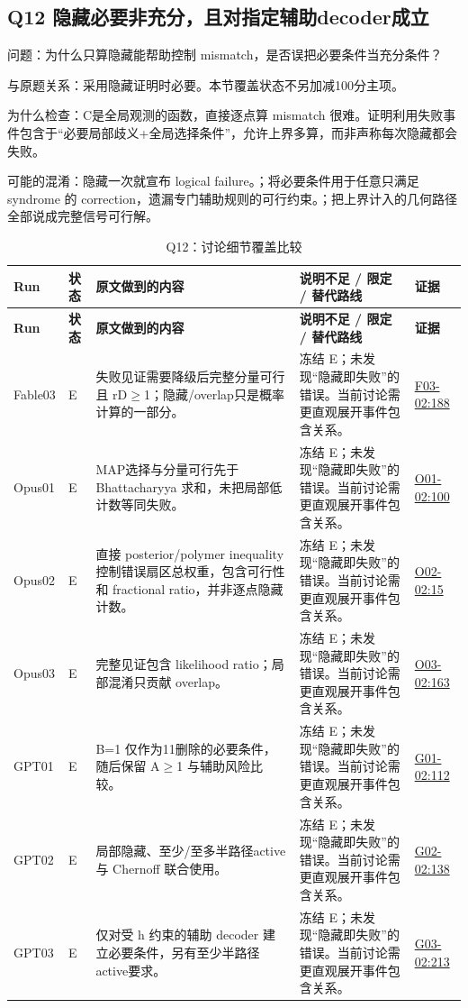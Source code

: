 \documentclass[11pt,a4paper]{article}
\begin{document}
\clearpage
\subsection{Q12 隐藏必要非充分，且对指定辅助decoder成立}
\label{aspect:Q12}
问题：为什么只算隐藏能帮助控制 mismatch，是否误把必要条件当充分条件？

与原题关系：采用隐藏证明时必要。本节覆盖状态不另加减100分主项。

为什么检查：C是全局观测的函数，直接逐点算 mismatch 很难。证明利用失败事件包含于“必要局部歧义+全局选择条件”，允许上界多算，而非声称每次隐藏都会失败。

可能的混淆：隐藏一次就宣布 logical failure。；将必要条件用于任意只满足 syndrome 的 correction，遗漏专门辅助规则的可行约束。；把上界计入的几何路径全部说成完整信号可行解。

{\fontsize{9.0}{12.6}\selectfont
\setlength{\tabcolsep}{2.5pt}
\begin{longtable}{>{\raggedright\arraybackslash}p{}>{\raggedright\arraybackslash}p{}>{\raggedright\arraybackslash}p{}>{\raggedright\arraybackslash}p{}>{\raggedright\arraybackslash}p{}}
\caption{Q12：讨论细节覆盖比较}\\
\toprule
\textbf{Run} & \textbf{状态} & \textbf{原文做到的内容} & \textbf{说明不足 / 限定 / 替代路线} & \textbf{证据}\tabularnewline
\midrule
\endfirsthead
\toprule
\textbf{Run} & \textbf{状态} & \textbf{原文做到的内容} & \textbf{说明不足 / 限定 / 替代路线} & \textbf{证据}\tabularnewline
\midrule
\endhead
{}Fable03 & E & 失败见证需要降级后完整分量可行且 rD\ensuremath{\geq}1；隐藏/overlap只是概率计算的一部分。 & 冻结 E；未发现“隐藏即失败”的错误。当前讨论需更直观展开事件包含关系。 & \hyperref[src:F03-02]{F03-02:188}\tabularnewline
{}Opus01 & E & MAP选择与分量可行先于 Bhattacharyya 求和，未把局部低计数等同失败。 & 冻结 E；未发现“隐藏即失败”的错误。当前讨论需更直观展开事件包含关系。 & \hyperref[src:O01-02]{O01-02:100}\tabularnewline
{}Opus02 & E & 直接 posterior/polymer inequality 控制错误扇区总权重，包含可行性和 fractional ratio，并非逐点隐藏计数。 & 冻结 E；未发现“隐藏即失败”的错误。当前讨论需更直观展开事件包含关系。 & \hyperref[src:O02-02]{O02-02:15}\tabularnewline
{}Opus03 & E & 完整见证包含 likelihood ratio；局部混淆只贡献 overlap。 & 冻结 E；未发现“隐藏即失败”的错误。当前讨论需更直观展开事件包含关系。 & \hyperref[src:O03-02]{O03-02:163}\tabularnewline
{}GPT01 & E & B=1 仅作为11删除的必要条件，随后保留 A\ensuremath{\geq}1 与辅助风险比较。 & 冻结 E；未发现“隐藏即失败”的错误。当前讨论需更直观展开事件包含关系。 & \hyperref[src:G01-02]{G01-02:112}\tabularnewline
{}GPT02 & E & 局部隐藏、至少/至多半路径active与 Chernoff 联合使用。 & 冻结 E；未发现“隐藏即失败”的错误。当前讨论需更直观展开事件包含关系。 & \hyperref[src:G02-02]{G02-02:138}\tabularnewline
{}GPT03 & E & 仅对受 h 约束的辅助 decoder 建立必要条件，另有至少半路径active要求。 & 冻结 E；未发现“隐藏即失败”的错误。当前讨论需更直观展开事件包含关系。 & \hyperref[src:G03-02]{G03-02:213}\tabularnewline
\bottomrule
\end{longtable}
}
\end{document}
